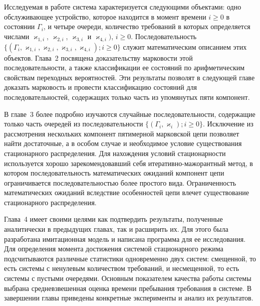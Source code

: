 Исследуемая в работе система характеризуется следующими объектами: одно обслуживающее устройство, которое находится в момент времени $i\geqslant 0$ в состоянии $\Gamma_i$, и четыре очереди, количество требований в которых определяется числами $\varkappa_{1,i}$, $\varkappa_{2,i}$, $\varkappa_{3,i}$ и $\varkappa_{4,i})$, $i\geqslant 0$. Последовательность \linebreak 
 $\{(\Gamma_i, \varkappa_{1,i}, \varkappa_{2,i}, \varkappa_{3,i},  \varkappa_{4,i}); i \geqslant 0\}$ служит математическим описанием этих объектов. Глава~2 посвящена доказательству  марковости этой последовательности, а также  классификации ее состояний по арифметическим свойствам переходных вероятностей. Эти результаты позволят в следующей главе доказать марковость и провести классификацию состояний для последовательностей, содержащих только часть из упомянутых пяти компонент.


В главе~3 более подробно изучаются случайные последовательности, содержащие только часть очередей из последовательности $\{(\Gamma_i, \varkappa_i);  i \geqslant 0\}$. Исключение из рассмотрения нескольких компонент пятимерной марковской цепи позволяет найти достаточные, а в особом случае и необходимое условие существования стационарного распределения. Для нахождения условий стационарности используется хорошо зарекомендовавший себя итеративно-мажорантный метод, в котором последовательность математических ожиданий компонент цепи ограничивается последовательностью более простого вида.
Ограниченность математических ожиданий вследствие особенностей цепи влечет существование стационарного распределения.


Глава~4 имеет своими целями как подтвердить результаты, полученные аналитически в предыдущих главах, так и расширить их. Для этого  была разработана имитационная модель и написана программа для ее исследования. Для определения момента достижения системой стационарного режима подсчитываются различные статистики одновременно двух систем: смещенной, то есть системы с ненулевым количеством требований, и несмещенной, то есть системы с пустыми очередями. Основным показателем качества работы системы выбрана средневзвешенная оценка времени пребывания требования в системе. В завершении главы приведены конкретные эксперименты и анализ их результатов.





